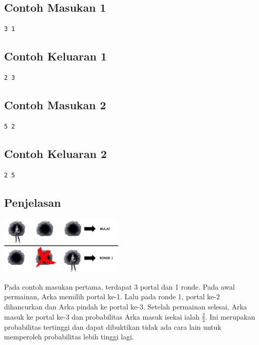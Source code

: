 \documentclass{article}
\begin{document}
\begin{multicols}{2}
\subsection*{Contoh Masukan 1}
\begin{lstlisting}
3 1
\end{lstlisting}
\columnbreak

\subsection*{Contoh Keluaran 1}
\begin{lstlisting}
2 3
\end{lstlisting}
\vfill
\null
\end{multicols}

\begin{multicols}{2}
\subsection*{Contoh Masukan 2}
\begin{lstlisting}
5 2
\end{lstlisting}
\columnbreak

\subsection*{Contoh Keluaran 2}
\begin{lstlisting}
2 5
\end{lstlisting}
\vfill
\null
\end{multicols}

\subsection*{Penjelasan}
\includegraphics[width=225px]{Contoh_Tebak_Isekai.jpg}

Pada contoh masukan pertama, terdapat 3 portal dan 1 ronde. Pada awal permainan, Arka memilih portal ke-1. Lalu pada ronde 1, portal ke-2 dihancurkan dan Arka pindah ke portal ke-3. Setelah permainan selesai, Arka masuk ke portal ke-3 dan probabilitas Arka masuk isekai ialah $\frac{2}{3}$. Ini merupakan probabilitas tertinggi dan dapat dibuktikan tidak ada cara lain untuk memperoleh probabilitas lebih tinggi lagi.
\end{document}
